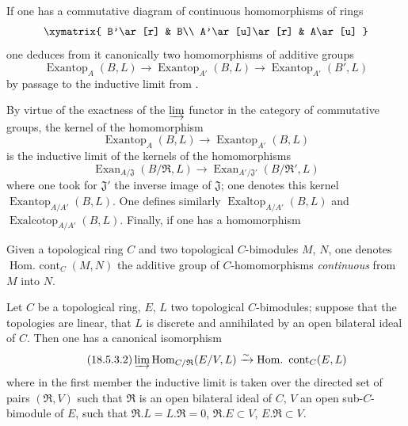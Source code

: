 \begin{env}[18.5.2]
\label{0.18.5.2}
If one has a commutative diagram of continuous homomorphisms of rings
\[
  \xymatrix{
    B'\ar[r] & B\\
    A'\ar[u]\ar[r] & A\ar[u]
  }
\]
one deduces from it canonically two homomorphisms of additive groups
\[
  \operatorname{Exantop}_A(B,L)\to\operatorname{Exantop}_{A'}(B,L)\to\operatorname{Exantop}_{A'}(B',L)
\]
by passage to the inductive limit from .

By virtue of the exactness of the $\varinjlim$ functor in the category of commutative groups, the kernel of the homomorphism
\[
  \operatorname{Exantop}_A(B,L)\to\operatorname{Exantop}_{A'}(B,L)
\]
is the inductive limit of the kernels of the homomorphisms
\[
  \operatorname{Exan}_{A/\mathfrak{J}}(B/\mathfrak{R},L)\to\operatorname{Exan}_{A'/\mathfrak{J}'}(B/\mathfrak{R}',L)
\]
where one took for $\mathfrak{J}'$ the inverse image of $\mathfrak{J}$; one denotes this kernel $\operatorname{Exantop}_{A/A'}(B,L)$.
One defines similarly $\operatorname{Exaltop}_{A/A'}(B,L)$ and $\operatorname{Exalcotop}_{A/A'}(B,L)$.
Finally, if one has a homomorphism
\end{env}

\begin{env}[18.5.3]
\label{0.18.5.3}
Given a topological ring $C$ and two topological $C$-bimodules $M$, $N$, one denotes $\operatorname{Hom.\ cont}_C(M,N)$ the additive group of $C$-homomorphisms \emph{continuous} from $M$ into $N$.
\end{env}

\begin{lemma}[18.5.3.1]
\label{0.18.5.3.1}
Let $C$ be a topological ring, $E$, $L$ two topological $C$-bimodules; suppose that the topologies are linear, that $L$ is discrete and annihilated by an open bilateral ideal of $C$.
Then one has a canonical isomorphism
\begin{equation}
\tag{18.5.3.2}
  \label{0.18.5.3.2}
  \varinjlim\operatorname{Hom}_{C/\mathfrak{R}}(E/V,L)\xrightarrow{\sim}\operatorname{Hom.\ cont}_C(E,L)
\end{equation}
where in the first member the inductive limit is taken over the directed set of pairs $(\mathfrak{R},V)$ such that $\mathfrak{R}$ is an open bilateral ideal of $C$, $V$ an open sub-$C$-bimodule of $E$, such that $\mathfrak{R}.L=L.\mathfrak{R}=0$, $\mathfrak{R}.E\subset V$, $E.\mathfrak{R}\subset V$.
\end{lemma}

